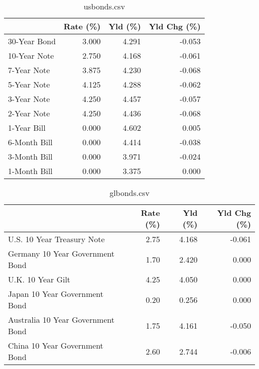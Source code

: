\documentclass{article}%
\begin{document}
%


\begin{table}[htbp]%
\caption{usbonds.csv}%
\centering%
\begin{adjustbox}{width=1\textwidth}%
\begin{tabular}{lrrr}
\toprule
             &  Rate (\%) &  Yld (\%) &  Yld Chg (\%) \\
\midrule
30-Year Bond &     3.000 &    4.291 &       -0.053 \\
10-Year Note &     2.750 &    4.168 &       -0.061 \\
 7-Year Note &     3.875 &    4.230 &       -0.068 \\
 5-Year Note &     4.125 &    4.288 &       -0.062 \\
 3-Year Note &     4.250 &    4.457 &       -0.057 \\
 2-Year Note &     4.250 &    4.436 &       -0.068 \\
 1-Year Bill &     0.000 &    4.602 &        0.005 \\
6-Month Bill &     0.000 &    4.414 &       -0.038 \\
3-Month Bill &     0.000 &    3.971 &       -0.024 \\
1-Month Bill &     0.000 &    3.375 &        0.000 \\
\bottomrule
\end{tabular}
%
\end{adjustbox}%
\end{table}

%


\begin{table}[htbp]%
\caption{glbonds.csv}%
\centering%
\begin{adjustbox}{width=1\textwidth}%
\begin{tabular}{lrrr}
\toprule
                                  &  Rate (\%) &  Yld (\%) &  Yld Chg (\%) \\
\midrule
       U.S. 10 Year Treasury Note &      2.75 &    4.168 &       -0.061 \\
  Germany 10 Year Government Bond &      1.70 &    2.420 &        0.000 \\
                U.K. 10 Year Gilt &      4.25 &    4.050 &        0.000 \\
    Japan 10 Year Government Bond &      0.20 &    0.256 &        0.000 \\
Australia 10 Year Government Bond &      1.75 &    4.161 &       -0.050 \\
    China 10 Year Government Bond &      2.60 &    2.744 &       -0.006 \\
\bottomrule
\end{tabular}
%
\end{adjustbox}%
\end{table}
\end{document}

